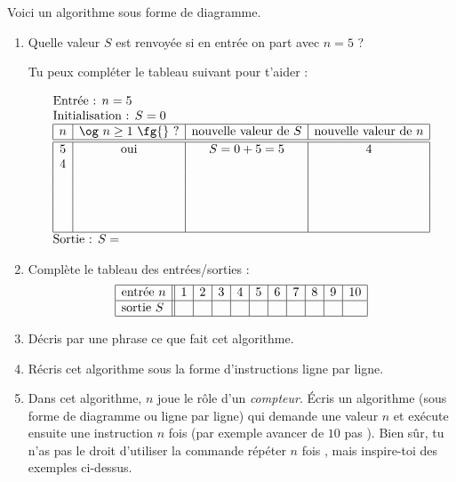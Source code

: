 \documentclass[class=report,crop=false, 12pt]{standalone}
\begin{document}
\begin{activite}
Voici un algorithme sous forme de diagramme.
  

  
\begin{enumerate}
    \item Quelle valeur $S$ est renvoyée si en entrée on part avec $n = 5$ ?
      
    Tu peux compléter le tableau suivant pour t'aider :
     
  $$
  \begin{array}{l}
  \text{Entrée : $n=5$}    \\
  \text{Initialisation : $S=0$}    \\  
  \begin{array}{|c|c|c|c|}
  \hline  
   n & \text{\og $n \ge 1$ \fg{} ?} & \text{nouvelle valeur de } S &  \text{nouvelle valeur de } n\\
  \hline\hline 
   5 & \text{oui} & S = 0+5 = 5 & 4 \\
   4 &  &  & \\
     &  &  & \\   
     &  &  & \\
     &  &  & \\      
     &  &  & \\
  \hline
  \end{array} \\
  \text{Sortie : $S = $}  
  \end{array} 
  $$ 
    
    \item Complète le tableau des entrées/sorties  : 
        $$\begin{array}{|l||c|c|c|c|c|c|c|c|c|c|}
  \hline
  \text{entrée } n & 1&2&3&4&5&6&7&8&9&10 \\
  \hline
  \text{sortie } S & &&&&&&&&& \\
  \hline
  \end{array}  
  $$ 
    \item Décris par une phrase ce que fait cet algorithme.
        
    \item Récris cet algorithme sous la forme d'instructions ligne par ligne.
    
    \item Dans cet algorithme, $n$ joue le rôle d'un \emph{compteur}. 
    Écris un algorithme (sous forme de diagramme ou ligne par ligne) qui demande une valeur $n$ et exécute ensuite une instruction $n$ fois (par exemple \og avancer de $10$ pas \fg{}). Bien sûr, tu n'as pas le droit d'utiliser la commande \og répéter $n$ fois \fg{}, mais inspire-toi des exemples ci-dessus.
\end{enumerate}
\end{activite}
\end{document}
